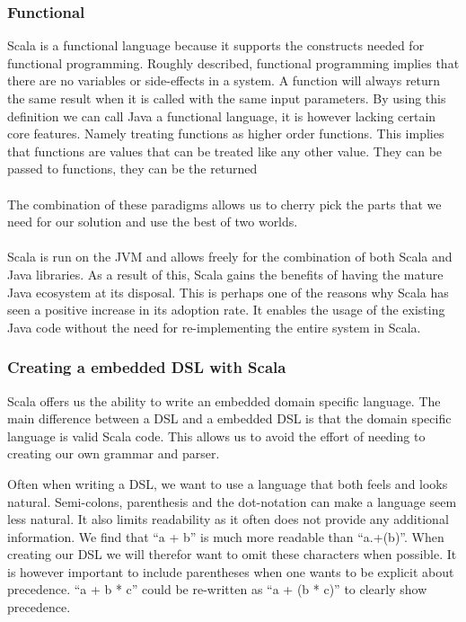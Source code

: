 \subsubsection{Functional}
Scala is a functional language because it supports the constructs needed for functional programming. Roughly described, functional programming implies that there are no variables or side-effects in a system. A function will always return the same result when it is called with the same input parameters. By using this definition we can call Java a functional language, it is however lacking certain core features. Namely treating functions as higher order functions. This implies that functions are values that can be  treated like any other value. They can be passed to functions, they can be the returned 
\\\\
The combination of these paradigms allows us to cherry pick the parts that we need for our solution and use the best of two worlds.
\\\\
Scala is run on the JVM and allows freely for the combination of both Scala and Java libraries. As a result of this, Scala gains the benefits of having the mature Java ecosystem at its disposal. This is perhaps one of the reasons why Scala has seen a positive increase in its adoption rate. It enables the usage of the existing Java code without the need for re-implementing the entire system in Scala.

\subsubsection{Creating a embedded DSL with Scala}
Scala offers us the ability to write an embedded domain specific language. The main difference between a DSL and a embedded DSL is that the domain specific language is valid Scala code. This allows us to avoid the effort of needing to creating our own grammar and parser. 

Often when writing a DSL, we want to use a language that both feels and looks natural. Semi-colons, parenthesis and the dot-notation can make a language seem less natural. It also limits readability as it often does not provide any additional information. We find that ``a + b'' is much more readable than ``a.+(b)''. When creating our DSL we will therefor want to omit these characters when possible. It is however important to include parentheses when one wants to be explicit about precedence. ``a + b * c'' could be re-written as ``a + (b * c)'' to clearly show precedence.

